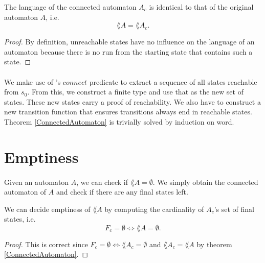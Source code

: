 \documentclass[11pt,a4paper,oneside]{book}
\begin{document}
            \begin{theorem}
                \label{ConnectedAutomaton}
                The language of the connected automaton $A_c$ is identical to that of the original automaton $A$, i.e.
                \[
                    \lang{A} = \lang{A_c}.
                \]
            \end{theorem}
            
            \begin{proof}
                By definition, unreachable states have no influence on the language of an automaton because there is no run from the starting state that contains such a state.
            \end{proof}

            \paragraph{}
                We make use of \ssreflect's $connect$ predicate to extract a sequence of all states reachable from $s_0$. 
                From this, we construct a finite type and use that as the new set of states. 
                These new states carry a proof of reachability.
                We also have to construct a new transition function that ensures transitions always end in reachable states.
                Theorem \ref{ConnectedAutomaton} is trivially solved by induction on word.


        \section{Emptiness}
            \paragraph{}
                Given an automaton $A$, we can check if $\lang{A} = \emptyset$. We simply obtain the connected automaton of $A$ and check if there are any final states left. 
                \begin{theorem} We can decide emptiness of $\lang{A}$ by computing the cardinality of $A_c$'s set of final states, i.e.
                    \label{AutomatonEmpty}
                    \[
                        F_c = \emptyset \Longleftrightarrow \lang{A} = \emptyset.
                    \]
                \end{theorem}

            \begin{proof}
                This is correct since $F_c = \emptyset \Leftrightarrow \lang{A_c} = \emptyset$ and $\lang{A_c} = \lang{A}$ by theorem \ref{ConnectedAutomaton}.
            \end{proof}
\end{document}
